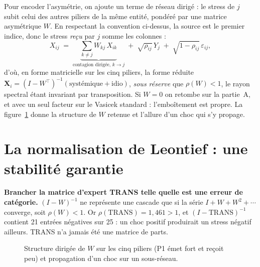Pour encoder l'asymétrie, on ajoute un terme de réseau dirigé : le stress de $j$ subit celui des
autres piliers de la même entité, pondéré par une matrice asymétrique $W$. En respectant
la convention ci-dessus, la source est le premier indice, donc le stress \emph{reçu} par $j$
somme les colonnes :
\begin{equation}
X_{ij} \;=\; \underbrace{\sum_{k\neq j} W_{kj}\,X_{ik}}_{\text{contagion dirigée, } k \to j}
   \;+\; \sqrt{\rho_{ij}}\,Y_j \;+\; \sqrt{1-\rho_{ij}}\,\varepsilon_{ij},
\end{equation}
d'où, en forme matricielle sur les cinq piliers, la forme réduite
$\mathbf X_i=(I-W^{\top})^{-1}(\text{systémique}+\text{idio})$, \emph{sous réserve} que
$\rho(W)<1$, le rayon spectral étant invariant par transposition. Si
$W=0$ on retombe sur la partie~A, et avec un seul facteur sur le Vasicek standard :
l'emboîtement est propre. La figure~\ref{fig:reseau-W} donne la structure de $W$ retenue et
l'allure d'un choc qui s'y propage.


\section{La normalisation de Leontief : une stabilité garantie}

\begin{attention}
\textbf{Brancher la matrice d'expert TRANS telle quelle est une erreur de catégorie.}
$(I-W)^{-1}$ ne représente une cascade que si la série $I+W+W^2+\cdots$ converge, soit
$\rho(W)<1$. Or $\rho(\mathrm{TRANS})=1{,}461>1$, et $(I-\mathrm{TRANS})^{-1}$ contient
21 entrées négatives sur 25 : un choc positif produirait un stress négatif ailleurs.
TRANS n'a jamais été une matrice de parts.
\end{attention}

\begin{figure}[H]\centering
{}
\caption{Structure dirigée de $W$ sur les cinq piliers (P1 émet fort et reçoit peu) et
propagation d'un choc sur un sous-réseau.}
\label{fig:reseau-W}
\end{figure}

